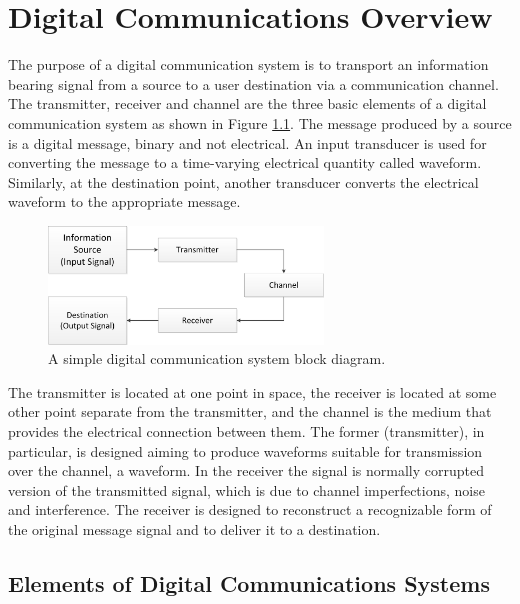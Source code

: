 \chapter{Digital Communications Overview}
\label{cap:digicomm}

The purpose of a digital communication system is to transport an information
bearing signal from a source to a user destination via a communication channel.
The transmitter, receiver and channel are the three basic elements of a digital
communication system as shown in Figure \ref{fig:digicomsimple}. The message
produced by a source is a digital message, binary and not electrical. An input
transducer is used for converting the message to a time-varying electrical
quantity called waveform. Similarly, at the destination point, another transducer
converts the electrical waveform to the appropriate message.


\begin{figure}[htbp]
    \centering
    \includegraphics[width=0.65\textwidth]{./figures/digicom_simple}
    \caption{ A simple digital communication system block diagram.
    \label{fig:digicomsimple}}
\end{figure}

The transmitter is located at one point in space, the receiver is located at
some other point separate from the transmitter, and the channel is the medium
that provides the electrical connection between them. The former (transmitter),
in particular, is designed aiming to produce waveforms suitable for transmission
over the channel, a waveform. In the receiver the signal is normally corrupted
version of the transmitted signal, which is due to channel imperfections, noise
and interference. The receiver is designed to reconstruct a recognizable form of
the original message signal and to deliver it to a destination.

\section{Elements of Digital Communications Systems}

